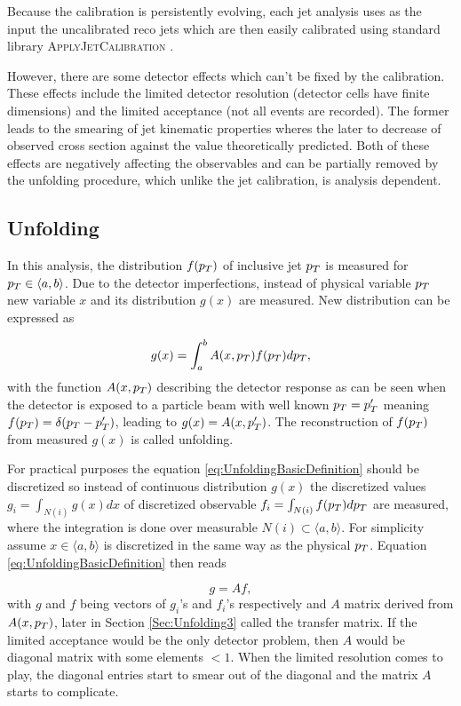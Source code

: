 Because the calibration is persistently evolving, each jet analysis uses as the
input the uncalibrated reco jets which are then easily calibrated using
standard library \textsc{ApplyJetCalibration} \cite{ApplyJetCalibration}.

However, there are some detector effects which can't be fixed by the calibration. These
effects include the limited detector resolution (detector cells have finite
dimensions) and the limited acceptance (not all events are recorded). The former
leads to the smearing of jet kinematic properties wheres the later to
decrease of observed cross section against the value theoretically
predicted. Both of these effects are negatively affecting the observables
and can be partially removed by the unfolding procedure, which unlike
the jet calibration, is analysis dependent. 

\subsection{Unfolding}

In this analysis, the distribution $f(p_{T})$ of inclusive jet $p_{T}$ is measured
for $p_{T} \in \langle a, b \rangle$. Due to the detector imperfections,
instead of physical variable $p_{T}$ new variable $x$ and its distribution
$g(x)$ are measured. New distribution can be expressed as

\begin{equation}
  g(x) = \int_a^b A(x, p_{T}) f(p_{T}) dp_{T},
  \label{eq:UnfoldingBasicDefinition}
\end{equation}
with the function $A(x, p_{T})$ describing the detector response as can be seen
when the detector is exposed to a particle beam with well known $p_{T} = p_{T}'$
meaning $f(p_{T}) = \delta(p_{T} - p_{T}')$, leading to $g(x) = A(x, p_{T}')$. The
reconstruction of $f(p_{T})$ from measured $g(x)$ is called unfolding.

For practical purposes the equation \eqref{eq:UnfoldingBasicDefinition} should
be discretized so instead of continuous distribution $g(x)$ the discretized
values $g_i = \int_{N(i)} g(x)dx$ of discretized observable $f_i =
\int_{N(i)} f(p_{T})dp_{T}$ are measured, where the integration is done over
measurable $N(i) \subset \langle a, b \rangle$. For simplicity assume $x \in
\langle a, b \rangle$ is discretized in the same way as the physical $p_{T}$.
Equation \eqref{eq:UnfoldingBasicDefinition} then reads

\begin{equation}
  g = Af,
  \label{eq:UnfoldingDiscretized}
\end{equation}
with $g$ and $f$ being vectors of $g_i$'s and $f_i$'s respectively and $A$
matrix derived from $A(x, p_{T})$, later in Section \ref{Sec:Unfolding3} called
the transfer matrix. If the limited acceptance would be the only detector
problem, then $A$ would be diagonal matrix with some elements $ < 1$. When the
limited resolution comes to play, the diagonal entries start to smear out of
the diagonal and the matrix $A$ starts to complicate.

